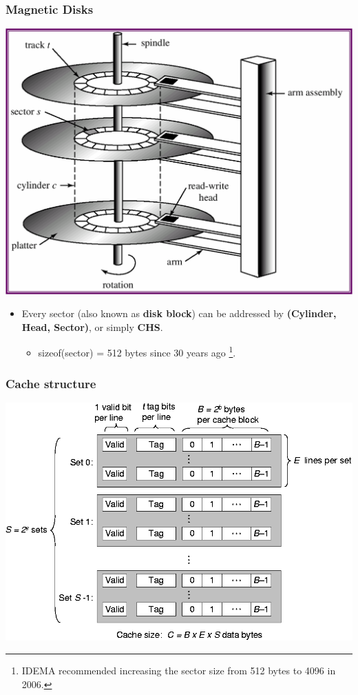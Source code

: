 \documentclass[CJKutf8,xcolor=pdftex,dvipsnames,table]{beamer}
\begin{document}
\begin{CJK*}{UTF8}{song}
  \begin{frame}
    \frametitle{Magnetic Disks} \pause
    \begin{center}
      \includegraphics[scale=.3]{v6f2-5} \pause
    \end{center}
    \begin{itemize}
    \item{Every sector (also known as \textbf{disk block}) can be addressed by \textbf{(Cylinder, Head, Sector)}, or simply \textbf{CHS}.} \pause
      \begin{itemize}
      \item{sizeof(sector) = 512 bytes since 30 years ago \footnote{IDEMA recommended increasing the sector size from 512 bytes to 4096 in 2006.}.} \pause
      \end{itemize}
    \end{itemize}
  \end{frame}

  \begin{frame}
    \frametitle{Cache structure} \pause
    \begin{center}
      \includegraphics[scale=0.4]{csappv1f6-25}
    \end{center}
  \end{frame}


\end{CJK*}
\end{document}
